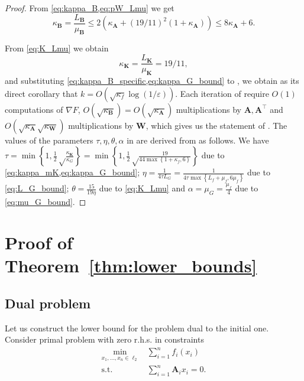 \documentclass{article}
\newcommand{\mA}{\mathbf{A}}
\newcommand{\mB}{\mathbf{B}}
\newcommand{\mK}{\mathbf{K}}
\newcommand{\mW}{\mathbf{W}}
\newcommand{\pW}{\mathbf{W'}}
\newcommand{\cbraces}[1]{\left( #1 \right)}
\newcommand{\braces}[1]{\left\{ #1 \right\}}
\newcommand{\eps}{\varepsilon}
\begin{document}
\begin{proof}
From \cref{eq:kappa_B,eq:pW_Lmu} we get
\begin{equation}\label{eq:kappa_B_specific}
  \kappa_\mB = \frac{L_\mB}{\mu_\mB} \leq 2\cbraces{\kappa_\mA + (19/11)^2(1 + \kappa_\mA)} \leq 8\kappa_\mA + 6.
\end{equation}

From \cref{eq:K_Lmu} we obtain
\begin{equation}\label{eq:kappa_mK}
  \kappa_\mK = \frac{L_\mK}{\mu_\mK} = 19/11,
\end{equation}
and substituting \cref{eq:kappa_B_specific,eq:kappa_G_bound} to , we obtain as its direct corollary that $k = O(\sqrt{\kappa_f} \log(1/\eps))$.
Each iteration of  require $O(1)$ computations of $\nabla F$, $O(\sqrt{\kappa_\mB}) = O(\sqrt{\kappa_\mA})$ multiplications by $\mA,\mA^\top$ and
$O(\sqrt{\kappa_\mA}\sqrt{\kappa_\mW})$ multiplications by $\mW$, which gives us the statement of .
The values of the parameters $\tau, \eta, \theta, \alpha$ in  are derived from  as follows.  We have $\tau = \min\braces{1, \frac12\sqrt\frac{\kappa_\mK}{\kappa_G}} = \min\braces{1, \frac12\sqrt\frac{19}{44\max\braces{1+\kappa_f,  6}}}$ due to \cref{eq:kappa_mK,eq:kappa_G_bound};
$\eta = \frac{1}{4\tau L_G} = \frac{1}{4\tau \max\braces{L_f + \mu_f, 6\mu_f}}$ due to \cref{eq:L_G_bound}; 
$\theta = \frac{15}{19\eta}$ due to \cref{eq:K_Lmu} and $\alpha = \mu_G = \frac{\mu_f}{4}$ due to \cref{eq:mu_G_bound}.
\end{proof}


\section{Proof of Theorem~\ref{thm:lower_bounds}}\label{app:lower_bounds_proof}

\subsection{Dual problem }

Let us construct the lower bound for the problem dual to the initial one. Consider primal problem with zero r.h.s. in constraints
\begin{equation}
  \begin{aligned}
   \label{prob:lower_primal}
	\min_{x_1, \ldots, x_n\in\ell_2}~ &\sum_{i=1}^n f_i(x_i) \\
	\text{s.t. } &\sum_{i=1}^n \mA_i x_i = 0.
  \end{aligned}
\end{equation}
\end{document}
